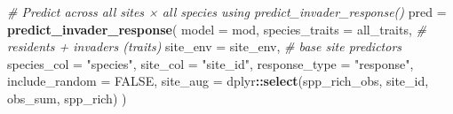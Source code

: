 \documentclass[
]{article}
\newenvironment{Shaded}{\begin{snugshade}}{\end{snugshade}}
\newcommand{\AttributeTok}[1]{\textcolor[rgb]{0.13,0.29,0.53}{#1}}
\newcommand{\CommentTok}[1]{\textcolor[rgb]{0.56,0.35,0.01}{\textit{#1}}}
\newcommand{\ConstantTok}[1]{\textcolor[rgb]{0.56,0.35,0.01}{#1}}
\newcommand{\FunctionTok}[1]{\textcolor[rgb]{0.13,0.29,0.53}{\textbf{#1}}}
\newcommand{\NormalTok}[1]{#1}
\newcommand{\OtherTok}[1]{\textcolor[rgb]{0.56,0.35,0.01}{#1}}
\newcommand{\SpecialCharTok}[1]{\textcolor[rgb]{0.81,0.36,0.00}{\textbf{#1}}}
\newcommand{\StringTok}[1]{\textcolor[rgb]{0.31,0.60,0.02}{#1}}
\begin{document}
\begin{Shaded}
\begin{Highlighting}[]
\CommentTok{\# Predict across all sites × all species using predict\_invader\_response()}
\NormalTok{pred }\OtherTok{=} \FunctionTok{predict\_invader\_response}\NormalTok{(}
  \AttributeTok{model          =}\NormalTok{ mod,}
  \AttributeTok{species\_traits =}\NormalTok{ all\_traits,   }\CommentTok{\# residents + invaders (traits)}
  \AttributeTok{site\_env       =}\NormalTok{ site\_env,     }\CommentTok{\# base site predictors}
  \AttributeTok{species\_col    =} \StringTok{"species"}\NormalTok{,}
  \AttributeTok{site\_col       =} \StringTok{"site\_id"}\NormalTok{,}
  \AttributeTok{response\_type  =} \StringTok{"response"}\NormalTok{,}
  \AttributeTok{include\_random =} \ConstantTok{FALSE}\NormalTok{,}
  \AttributeTok{site\_aug       =}\NormalTok{ dplyr}\SpecialCharTok{::}\FunctionTok{select}\NormalTok{(spp\_rich\_obs, site\_id, obs\_sum, spp\_rich)}
\NormalTok{)}


\end{Highlighting}
\end{Shaded}
\end{document}
